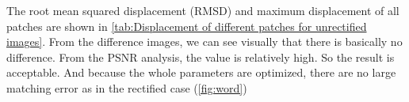 The root mean squared displacement (RMSD) and maximum displacement of all patches are shown in \cref{tab:Displacement of different patches for unrectified images}. From the difference images, we can see visually that there is basically no difference. From the PSNR analysis, the value is relatively high. So the result is acceptable. And because the whole parameters are optimized, there are no large matching error as in the rectified case (\cref{fig:word})
\begin{figure}[htbp]\centering
	  \hspace{-2mm}
	 \hspace{-2mm}
	\hspace{-2.5mm}
	\\


\end{figure}
